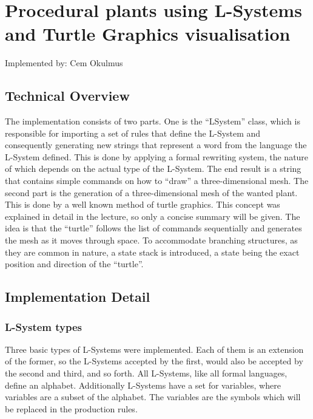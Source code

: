\documentclass[11pt,a4paper]{article}
\begin{document}
\section{Procedural plants using L-Systems and Turtle Graphics \newline visualisation}
Implemented by: Cem Okulmus

\subsection{Technical Overview}
The implementation consists of two parts. One is the ``LSystem'' class, which is
responsible for importing a set of rules that define the L-System and
consequently generating new strings that represent a word from the language the
L-System defined. This is done by applying a formal rewriting system, the nature
of which depends on the actual type of the L-System. The end result is a string that contains simple commands on how to ``draw'' a three-dimensional mesh.
\newline
The second part is the generation of a three-dimensional mesh of the wanted
plant. This is done by a well known method of turtle graphics. This concept was
explained in detail in the lecture, so only a concise summary will be given. 
The idea is that the ``turtle'' follows the list of commands sequentially and
generates the mesh as it moves through space. To accommodate branching
structures, as they are common in nature, a state stack is introduced, a state
being the exact position and direction of the ``turtle''.

\subsection{Implementation Detail}

\subsubsection{L-System types}
Three basic types of L-Systems were implemented. Each of them is an extension of the former, so the L-Systems accepted by the first, would also be accepted by the second and third, and so forth. All L-Systems, like all formal languages, define an alphabet. Additionally L-Systems have a set for variables, where variables are a subset of the alphabet. The variables are the symbols which will be replaced in the production rules.
\end{document}
